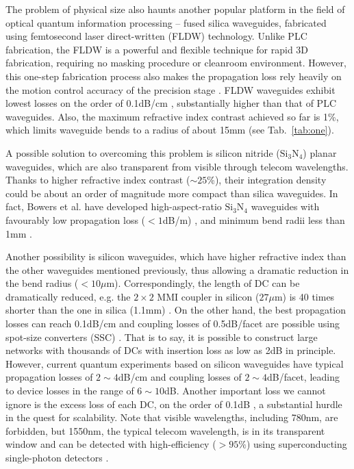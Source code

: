 \documentclass[aps,rmp,twocolumn,amsmath,amssymb,nofootinbib,superscriptaddress]{revtex4}
\newcommand{\comment}[1]{{\color{blue}{#1}}}
\begin{document}
The problem of physical size \comment{I don't understand this sentence???} also haunts another popular platform in the field of optical quantum information processing -- fused silica waveguides, fabricated using femtosecond laser direct-written (FLDW) technology. Unlike PLC fabrication, the FLDW is a powerful and flexible technique for rapid 3D fabrication, requiring no masking procedure or cleanroom environment. However, this one-step fabrication process also makes the propagation loss rely heavily on the motion control accuracy of the precision stage \cite{bib:63}. FLDW waveguides exhibit lowest losses on the order of 0.1dB/cm \cite{bib:63}, substantially higher than that of PLC waveguides. Also, the maximum refractive index contrast achieved so far is 1\%, which limits waveguide bends to a radius of about 15mm (see Tab.~\ref{tab:one}).

A possible solution to overcoming this problem is silicon nitride ($\mathrm{Si}_3\mathrm{N}_4$) planar waveguides, which are also transparent from visible through telecom wavelengths. Thanks to higher refractive index contrast ($\sim 25$\%), their integration density could be about an order of magnitude more compact than silica waveguides. In fact, Bowers et al. have developed high-aspect-ratio $\mathrm{Si}_3\mathrm{N}_4$ waveguides with favourably low propagation loss ($<1$dB/m) \cite{bib:64}, and minimum bend radii less than 1mm \cite{bib:65}.

Another possibility is silicon waveguides, which have higher refractive index than the other waveguides mentioned previously, thus allowing a dramatic reduction in the bend radius ($<10\mu\mathrm{m}$). Correspondingly, the length of DC can be dramatically reduced, e.g. the $2\times 2$ MMI coupler in silicon ($27\mu\mathrm{m}$) \cite{bib:66} is 40 times shorter than the one in silica (1.1mm) \cite{bib:67}. On the other hand, the best propagation losses can reach 0.1dB/cm \cite{bib:68, bib:69} and coupling losses of 0.5dB/facet are possible using spot-size converters (SSC) \cite{bib:70, bib:71}. That is to say, it is possible to construct large networks with thousands of DCs with insertion loss as low as 2dB in principle. However, current quantum experiments based on silicon waveguides \cite{bib:43, bib:72} have typical propagation losses of $2\sim 4$dB/cm and coupling losses of $2\sim 4$dB/facet, leading to device losses in the range of $6\sim 10$dB. Another important loss we cannot ignore is the excess loss of each DC, on the order of 0.1dB \cite{bib:72, bib:73, bib:74}, a substantial hurdle in the quest for scalability. Note that visible wavelengths, including 780nm, are forbidden, but 1550nm, the typical telecom wavelength, is in its transparent window and can be detected with high-efficiency ($>95\%$) using superconducting single-photon detectors \cite{bib:75}.
\end{document}
